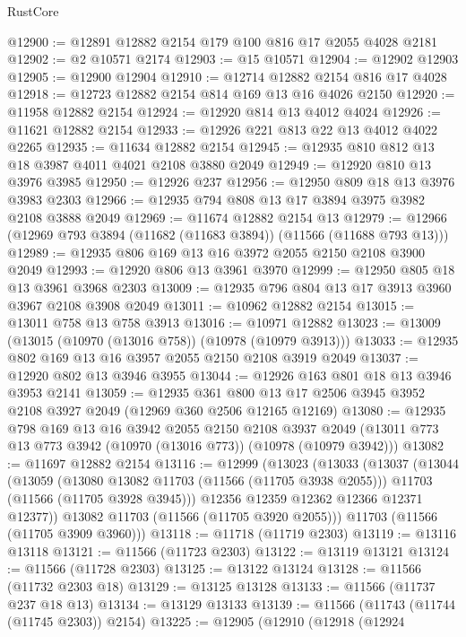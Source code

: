 \begin{lexlean}{RustCore}
\begin{coremodule}
@12900 := @12891 @12882 @2154 @179 @100 @816 @17 @2055 @4028 @2181
@12902 := @2 @10571 @2174
@12903 := @15 @10571
@12904 := @12902 @12903
@12905 := @12900 @12904
@12910 := @12714 @12882 @2154 @816 @17 @4028
@12918 := @12723 @12882 @2154 @814 @169 @13 @16 @4026 @2150
@12920 := @11958 @12882 @2154
@12924 := @12920 @814 @13 @4012 @4024
@12926 := @11621 @12882 @2154
@12933 := @12926 @221 @813 @22 @13 @4012 @4022 @2265
@12935 := @11634 @12882 @2154
@12945 := @12935 @810 @812 @13 @18 @3987 @4011 @4021 @2108 @3880 @2049
@12949 := @12920 @810 @13 @3976 @3985
@12950 := @12926 @237
@12956 := @12950 @809 @18 @13 @3976 @3983 @2303
@12966 := @12935 @794 @808 @13 @17 @3894 @3975 @3982 @2108 @3888 @2049
@12969 := @11674 @12882 @2154 @13
@12979 := @12966 (@12969 @793 @3894 (@11682 (@11683 @3894)) (@11566 (@11688 @793 @13)))
@12989 := @12935 @806 @169 @13 @16 @3972 @2055 @2150 @2108 @3900 @2049
@12993 := @12920 @806 @13 @3961 @3970
@12999 := @12950 @805 @18 @13 @3961 @3968 @2303
@13009 := @12935 @796 @804 @13 @17 @3913 @3960 @3967 @2108 @3908 @2049
@13011 := @10962 @12882 @2154
@13015 := @13011 @758 @13 @758 @3913
@13016 := @10971 @12882
@13023 := @13009 (@13015 (@10970 (@13016 @758)) (@10978 (@10979 @3913)))
@13033 := @12935 @802 @169 @13 @16 @3957 @2055 @2150 @2108 @3919 @2049
@13037 := @12920 @802 @13 @3946 @3955
@13044 := @12926 @163 @801 @18 @13 @3946 @3953 @2141
@13059 := @12935
    @361
    @800
    @13
    @17
    @2506
    @3945
    @3952
    @2108
    @3927
    @2049
    (@12969 @360 @2506 @12165 @12169)
@13080 := @12935
    @798
    @169
    @13
    @16
    @3942
    @2055
    @2150
    @2108
    @3937
    @2049
    (@13011 @773 @13 @773 @3942 (@10970 (@13016 @773)) (@10978 (@10979 @3942)))
@13082 := @11697 @12882 @2154
@13116 := @12999
    (@13023
      (@13033
        (@13037
          (@13044
            (@13059
              (@13080 @13082 @11703 (@11566 (@11705 @3938 @2055)))
              @11703
              (@11566 (@11705 @3928 @3945)))
            @12356
            @12359
            @12362
            @12366
            @12371
            @12377))
        @13082
        @11703
        (@11566 (@11705 @3920 @2055)))
      @11703
      (@11566 (@11705 @3909 @3960)))
@13118 := @11718 (@11719 @2303)
@13119 := @13116 @13118
@13121 := @11566 (@11723 @2303)
@13122 := @13119 @13121
@13124 := @11566 (@11728 @2303)
@13125 := @13122 @13124
@13128 := @11566 (@11732 @2303 @18)
@13129 := @13125 @13128
@13133 := @11566 (@11737 @237 @18 @13)
@13134 := @13129 @13133
@13139 := @11566 (@11743 (@11744 (@11745 @2303)) @2154)
@13225 := @12905
    (@12910
      (@12918
        (@12924

\end{coremodule}
\end{lexlean}
